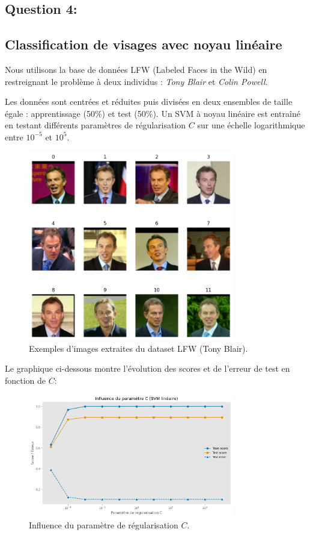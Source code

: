 \documentclass[12pt]{article}
\begin{document}
\subsection{Question 4: }
\subsection*{Classification de visages avec noyau linéaire}

Nous utilisons la base de données LFW (Labeled Faces in the Wild) en restreignant 
le problème à deux individus : \textit{Tony Blair} et \textit{Colin Powell}. 

Les données sont centrées et réduites puis divisées en deux ensembles de taille égale : apprentissage 
(50\%) et test (50\%). Un SVM à noyau linéaire est entraîné en testant différents 
paramètres de régularisation $C$ sur une échelle logarithmique entre $10^{-5}$ et $10^{5}$.

\begin{figure}[h!]
  \centering
  \includegraphics[width=0.8\textwidth]{images/faces1.png}
  \caption{Exemples d’images extraites du dataset LFW (Tony Blair).}
\end{figure}
\newpage
Le graphique ci-dessous montre l’évolution des scores et de l’erreur de test 
en fonction de  $C$:

\begin{figure}[h!]
  \centering
  \includegraphics[width=0.8\textwidth]{images/Q4.png}
  \caption{Influence du paramètre de régularisation $C$.}
\end{figure}
\end{document}
